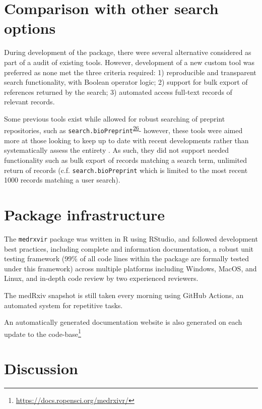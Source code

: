 \documentclass[a4paper, twoside]{templates/ociamthesis}
\begin{document}
\hypertarget{comparison-with-other-search-options}{%
\section{Comparison with other search options}\label{comparison-with-other-search-options}}

During development of the package, there were several alternative considered as part of a audit of existing tools. However, development of a new custom tool was preferred as none met the three criteria required: 1) reproducible and transparent search functionality, with Boolean operator logic; 2) support for bulk export of references returned by the search; 3) automated access full-text records of relevant records.

Some previous tools exist while allowed for robust searching of preprint repositories, such as \texttt{search.bioPreprint}\textsuperscript{\protect\hyperlink{ref-iwema2016}{26}}- however, these tools were aimed more at those looking to keep up to date with recent developments rather than systematically assess the entirety . As such, they did not support needed functionality such as bulk export of records matching a search term, unlimited return of records (c.f. \texttt{search.bioPreprint} which is limited to the most recent 1000 records matching a user search).

\hypertarget{package-infrastructure}{%
\section{Package infrastructure}\label{package-infrastructure}}

The \texttt{medrxvir} package was written in R using RStudio, and followed development best practices, including complete and information documentation, a robust unit testing framework (99\% of all code lines within the package are formally tested under this framework) across multiple platforms including Windows, MacOS, and Linux, and in-depth code review by two experienced reviewers.

The medRxiv snapshot is still taken every morning using GitHub Actions, an automated system for repetitive tasks.

An automatically generated documentation website is also generated on each update to the code-base\footnote{\url{https://docs.ropensci.org/medrxivr/}}

\hypertarget{discussion}{%
\section{Discussion}\label{discussion}}
\end{document}
